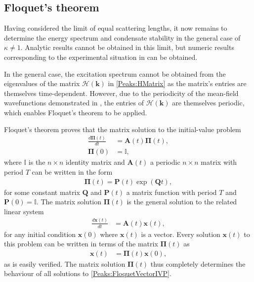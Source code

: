 \subsection[Floquet's theorem]{Floquet's theorem \citep{Nayfeh:1995}}
\label{Peaks:FloquetsTheorem}

Having considered the limit of equal scattering lengths, it now remains to determine the energy spectrum and condensate stability in the general case of $\kappa \neq 1$. Analytic results cannot be obtained in this limit, but numeric results corresponding to the experimental situation in  can be obtained.

In the general case, the excitation spectrum cannot be obtained from the eigenvalues of the matrix $\mathcal{H}(\bm{k})$ in \eqref{Peaks:HMatrix} as the matrix's entries are  themselves time-dependent. However, due to the periodicity of the mean-field wavefunctions demonstrated in , the entries of $\mathcal{H}(\bm{k})$ are themselves periodic, which enables Floquet's theorem to be applied.

Floquet's theorem proves that the matrix solution to the initial-value problem
\begin{subequations}
    \label{Peaks:FloquetMatrixIVP}
    \begin{align}
        \frac{d\bm{\Pi}(t)}{dt} &= \bm{A}(t) \bm{\Pi}(t),\\
        \bm{\Pi}(0) &= \mathbb{I},
    \end{align}
\end{subequations}
where $\mathbb{I}$ is the $n \times n$ identity matrix and $\bm{A}(t)$ a periodic $n \times n$ matrix with period $T$ can be written in the form
\begin{align}
    \bm{\Pi}(t) = \bm{P}(t) \exp(\bm{Q} t),
\end{align}
for some constant matrix $\bm{Q}$ and $\bm{P}(t)$ a matrix function with period $T$ and $\bm{P}(0) = \mathbb{I}$. The matrix solution $\bm{\Pi}(t)$ is the general solution to the related linear system
\begin{align}
    \frac{d\bm{x}(t)}{dt} &= \bm{A}(t) \bm{x}(t),
    \label{Peaks:FloquetVectorIVP}
\end{align}
for any initial condition $\bm{x}(0)$ where $\bm{x}(t)$ is a vector. Every solution $\bm{x}(t)$ to this problem can be written in terms of the matrix $\bm{\Pi}(t)$ as
\begin{align}
    \bm{x}(t) &= \bm{\Pi}(t) \bm{x}(0),
\end{align}
as is easily verified. The matrix solution $\bm{\Pi}(t)$ thus completely determines the behaviour of all solutions to \eqref{Peaks:FloquetVectorIVP}.

